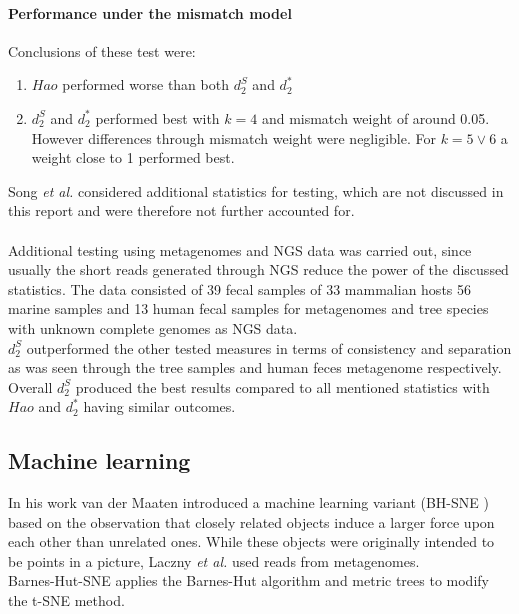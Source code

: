 \documentclass[twocolumn]{bmcart}%
\begin{document}
\paragraph*{Performance under the mismatch model}
Conclusions of these test were: 
\begin{enumerate}
\item $Hao$ performed worse than both $d_2^S$ and $d_2^*$	
\item $d_2^S$ and $d_2^*$ performed best with $k=4$ and mismatch weight of around 0.05. However differences through mismatch weight were negligible. For $k=5 \lor 6$ a weight close to 1 performed best.
\end{enumerate}
Song \textit{et al.} considered additional statistics for testing, which are not discussed in this report and were therefore not further accounted for.\\
\\
Additional testing using metagenomes and NGS data was carried out\cite{doi:10.1093/bib/bbt067}, since usually the short reads generated through NGS reduce the power of the discussed statistics. The data consisted of 39 fecal samples of 33 mammalian hosts\cite{muegge2011diet} 56 marine samples\cite{rusch2007sorcerer} and 13 human fecal samples\cite{kurokawa2007comparative} for metagenomes and tree species with unknown complete genomes as NGS data.\\
$d_2^S$ outperformed the other tested measures in terms of consistency and separation as was seen through the tree samples and human feces metagenome respectively. \\
Overall $d_2^S$ produced the best results compared to all mentioned statistics with $Hao$ and $d_2^*$ having similar outcomes.
\subsection*{Machine learning}
In his work van der Maaten \cite{DBLP:journals/corr/abs-1301-3342} introduced a machine learning variant (BH-SNE ) based on the observation that closely related objects induce a larger force upon each other than unrelated ones. While these objects were originally intended to be points in a picture, Laczny \textit{et al.}\cite{Laczny2014} used reads from metagenomes.\\
Barnes-Hut-SNE applies the Barnes-Hut algorithm and metric trees to modify the t-SNE method.
\end{document}
